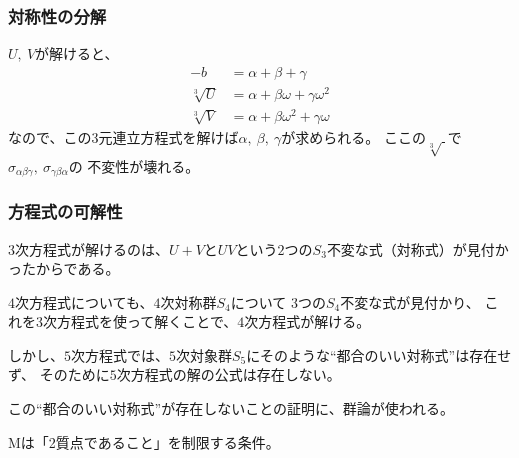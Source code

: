 \documentclass[12pt, t]{beamer}
\begin{document}
\begin{frame}
\frametitle{対称性の分解}
$U,\ V$が解けると、
\begin{align}
  -b &= \alpha + \beta + \gamma \\
  \sqrt[3]{U} &= \alpha + \beta \omega + \gamma \omega^2 \\
  \sqrt[3]{V} &= \alpha + \beta \omega^2 + \gamma \omega
\end{align}
なので、この$3$元連立方程式を解けば$\alpha,\ \beta,\ \gamma$が求められる。
ここの$\sqrt[3]{\ }$で$\sigma_{\alpha \beta \gamma},\ \sigma_{\gamma \beta \alpha}$の
不変性が壊れる。
\end{frame}

\begin{frame}
\frametitle{方程式の可解性}
$3$次方程式が解けるのは、$U + V$と$UV$という$2$つの$S_3$不変な式（対称式）が見付かったからである。

$4$次方程式についても、$4$次対称群$S_4$について $3$つの$S_4$不変な式が見付かり、
これを$3$次方程式を使って解くことで、$4$次方程式が解ける。

しかし、$5$次方程式では、$5$次対象群$S_5$にそのような``都合のいい対称式''は存在せず、
そのために$5$次方程式の解の公式は存在しない。

この``都合のいい対称式''が存在しないことの証明に、群論が使われる。
\end{frame}

\begin{frame}
Mは「2質点であること」を制限する条件。

\end{frame}
\end{document}
